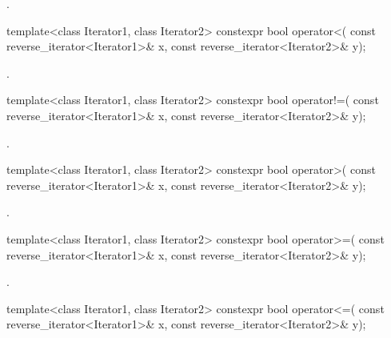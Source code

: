 \begin{itemdescr}
\pnum
\returns
{}.
\end{itemdescr}

%
\begin{itemdecl}
template<class Iterator1, class Iterator2>
  constexpr bool operator<(
    const reverse_iterator<Iterator1>& x,
    const reverse_iterator<Iterator2>& y);
\end{itemdecl}

\begin{itemdescr}
\pnum
\returns
{}.
\end{itemdescr}

%
\begin{itemdecl}
template<class Iterator1, class Iterator2>
  constexpr bool operator!=(
    const reverse_iterator<Iterator1>& x,
    const reverse_iterator<Iterator2>& y);
\end{itemdecl}

\begin{itemdescr}
\pnum
\returns
{}.
\end{itemdescr}

%
\begin{itemdecl}
template<class Iterator1, class Iterator2>
  constexpr bool operator>(
    const reverse_iterator<Iterator1>& x,
    const reverse_iterator<Iterator2>& y);
\end{itemdecl}

\begin{itemdescr}
\pnum
\returns
{}.
\end{itemdescr}

%
\begin{itemdecl}
template<class Iterator1, class Iterator2>
  constexpr bool operator>=(
    const reverse_iterator<Iterator1>& x,
    const reverse_iterator<Iterator2>& y);
\end{itemdecl}

\begin{itemdescr}
\pnum
\returns
{}.
\end{itemdescr}

%
\begin{itemdecl}
template<class Iterator1, class Iterator2>
  constexpr bool operator<=(
    const reverse_iterator<Iterator1>& x,
    const reverse_iterator<Iterator2>& y);
\end{itemdecl}

